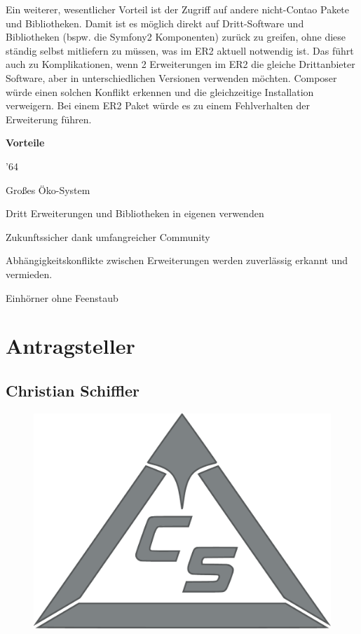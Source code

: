 \documentclass[
paper=a4,
draft=false,%
fontsize=10pt%
]{scrartcl}
\begin{document}
Ein weiterer, wesentlicher Vorteil ist der Zugriff auf andere nicht-Contao Pakete und Bibliotheken. Damit ist es möglich direkt auf Dritt-Software und Bibliotheken (bspw. die Symfony2 Komponenten) zurück zu greifen, ohne diese ständig selbst mitliefern zu müssen, was im ER2 aktuell notwendig ist. Das führt auch zu Komplikationen, wenn 2 Erweiterungen im ER2 die gleiche Drittanbieter Software, aber in unterschiedlichen Versionen verwenden möchten. Composer würde einen solchen Konflikt erkennen und die gleichzeitige Installation verweigern. Bei einem ER2 Paket würde es zu einem Fehlverhalten der Erweiterung führen.

\textbf{Vorteile}
\begin{dinglist}{'64}
\item Großes Öko-System
\item Dritt Erweiterungen und Bibliotheken in eigenen verwenden
\item Zukunftssicher dank umfangreicher Community
\item Abhängigkeitskonflikte zwischen Erweiterungen werden zuverlässig erkannt und vermieden.
\item Einhörner ohne Feenstaub
\end{dinglist}

\newpage

%
%

\section{Antragsteller}
\label{sec:proposer}

\subsection*{Christian  Schiffler}

\begin{figure}
  \vspace{-50pt}
  \hfill
  \includegraphics[width=.2\textwidth]{bilder/cyberspectrum}
\end{figure}
\end{document}
